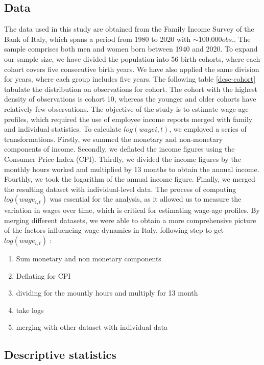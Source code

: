 \documentclass[14pt]{sistedes}
\begin{document}
\subsection{Data}
The data used in this study are obtained from the Family Income Survey of the Bank of Italy, which spans a period from
1980 to 2020 with $\sim100.000 obs.$. The sample comprises both men and women born between 1940 and 2020. To expand our
sample size, we have divided the population into 56 birth cohorts, where each cohort covers five consecutive birth
years. We have also applied the same division for years, where each group includes five years. The following table
\ref{desc-cohort} tabulate the distribution on observations for cohort. The cohort with the highest density of
observations is cohort 10, whereas the younger and older cohorts have relatively few observations. The objective of the
study is to estimate wage-age profiles, which required the use of employee income reports merged with family and
individual statistics. To calculate $log(wagei,t)$, we employed a series of transformations. Firstly, we summed the
monetary and non-monetary components of income. Secondly, we deflated the income figures using the Consumer Price Index
(CPI). Thirdly, we divided the income figures by the monthly hours worked and multiplied by 13 months to obtain the
annual income. Fourthly, we took the logarithm of the annual income figure. Finally, we merged the resulting dataset
with individual-level data.
\newline
The process of computing \(log(wage_{i,t})\) was essential for the analysis, as it allowed us to measure the variation
in wages over time, which is critical for estimating wage-age profiles. By merging different datasets, we were able to
obtain a more comprehensive picture of the factors influencing wage dynamics in Italy.  following step to get
\(log(wage_{i,t})\) :
\begin{enumerate}
    \item Sum monetary and non monetary components 
    \item Deflating for CPI
    \item dividing for the mountly hours and multiply for 13 month
    \item take logs
    \item merging with other dataset with individual data
\end{enumerate}
\subsection{Descriptive statistics}
\end{document}
